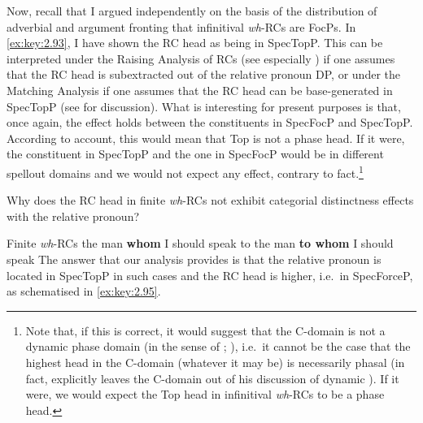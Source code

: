 \documentclass[output=paper]{langsci/langscibook}
\begin{document}
Now, recall that I argued independently on the basis of the distribution of
adverbial and argument fronting that infinitival \emph{wh}-\glspl{RC} are FocPs. In
\eqref{ex:key:2.93}, I have shown the \gls{RC} head as being in SpecTopP\@. This
can be interpreted under the Raising Analysis of \glspl{RC} (see especially
\citealt{Bianchi1999,Bianchi2000}) if one assumes that the \gls{RC} head is
subextracted out of the relative pronoun DP, or under the Matching Analysis if
one assumes that the \gls{RC} head can be base-generated in SpecTopP (see
\citealt{Douglas2016} for discussion). What is interesting for present purposes
is that, once again, the  effect holds between the
constituents in SpecFocP and SpecTopP\@.  According to 
account, this would mean that Top is not a phase head. If it were, the
constituent in SpecTopP and the one in SpecFocP would be in different spellout
domains and we would not expect any  effect, contrary to
fact.\footnote{Note that, if this is correct, it would suggest that the
    C-domain is not a dynamic phase domain (in the sense of
    \citealt{Boskovic2014}; \citealt{Harwood2015}), i.e.\ it cannot be the case that the highest head
    in the C-domain (whatever it may be) is necessarily phasal (in fact,
    \citealt{Boskovic2014} explicitly leaves the C-domain out of his discussion of
    dynamic ). If it were, we would expect the Top head in infinitival
\emph{wh}-\glspl{RC} to be a phase head.}

Why does the \gls{RC} head in finite \emph{wh}-\glspl{RC} not exhibit
categorial distinctness effects with the relative pronoun?

\ea\label{ex:key:2.94} Finite \emph{wh}-\glspl{RC}
    \ea     the man \textbf{whom} I should speak to
    \ex    the man \textbf{to whom} I should speak
    \z
\z
The answer that our analysis provides is that the relative pronoun is located
in SpecTopP in such cases and the \gls{RC} head is higher, i.e.\ in SpecForceP, as
schematised in \eqref{ex:key:2.95}.
\end{document}
